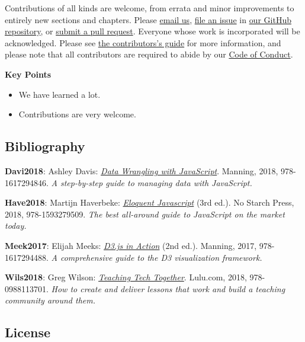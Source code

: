Contributions of all kinds are welcome, from errata and minor
improvements to entirely new sections and chapters. Please
\href{mailto:gvwilson@third-bit.com}{email us},
\href{https://github.com/software-tools-in-javascript/js-vs-ds/issues}{file
an issue} in
\href{https://github.com/software-tools-in-javascript/js-vs-ds/}{our
GitHub repository}, or
\href{https://github.com/software-tools-in-javascript/js-vs-ds/pulls}{submit
a pull request}. Everyone whose work is incorporated will be
acknowledged. Please see \protect\hyperlink{s:contributing}{the
contributors's guide} for more information, and please note that all
contributors are required to abide by our
\protect\hyperlink{s:conduct}{Code of Conduct}.

\textbf{Key Points}

\begin{itemize}
\tightlist
\item
  We have learned a lot.
\item
  Contributions are very welcome.
\end{itemize}

\subsection{Bibliography}\label{s:bib}

\textbf{Davi2018}: Ashley Davis:
\emph{\href{https://www.manning.com/books/data-wrangling-with-javascript}{Data
Wrangling with JavaScript}}. Manning, 2018, 978-1617294846. \emph{A
step-by-step guide to managing data with JavaScript.}

\textbf{Have2018}: Martijn Haverbeke:
\emph{\href{https://eloquentjavascript.net/}{Eloquent Javascript}} (3rd
ed.). No Starch Press, 2018, 978-1593279509. \emph{The best all-around
guide to JavaScript on the market today.}

\textbf{Meek2017}: Elijah Meeks:
\emph{\href{https://www.manning.com/books/d3js-in-action-second-edition}{D3.js
in Action}} (2nd ed.). Manning, 2017, 978-1617294488. \emph{A
comprehensive guide to the D3 visualization framework.}

\textbf{Wils2018}: Greg Wilson:
\emph{\href{http://teachtogether.tech}{Teaching Tech Together}}.
Lulu.com, 2018, 978-0988113701. \emph{How to create and deliver lessons
that work and build a teaching community around them.}

\subsection{License}\label{s:license}

